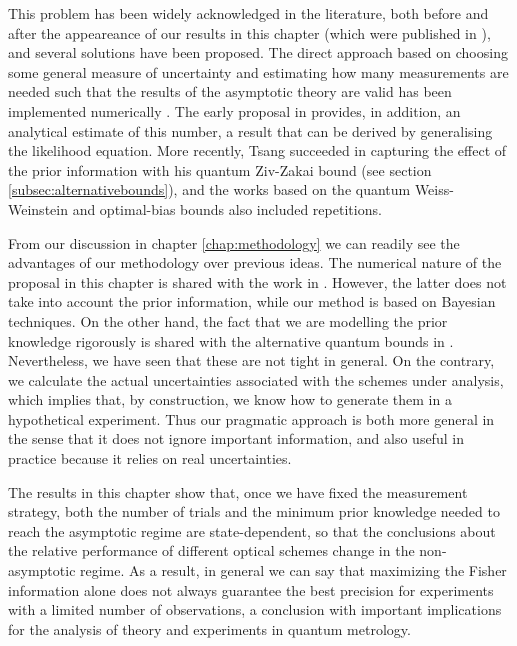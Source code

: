 This problem has been widely acknowledged in the literature, both before \cite{braunstein_gaussian1992, hall2012, tsang2012, tsang2016, rafal2015, liu2016} and after \cite{smirne2018, lumino2017, braun2018, haase2018may} the appeareance of our results in this chapter (which were published in \cite{jesus2017}), and several solutions have been proposed. The direct approach based on choosing some general measure of uncertainty and estimating how many measurements are needed such that the results of the asymptotic theory are valid has been implemented numerically \cite{braunstein_maxlikelihood1992, braunstein_gaussian1992}. The early proposal in \cite{braunstein_gaussian1992} provides, in addition, an analytical estimate of this number, a result that can be derived by generalising the likelihood equation. More recently, Tsang \cite{tsang2012} succeeded in capturing the effect of the prior information with his quantum Ziv-Zakai bound (see section \ref{subsec:alternativebounds}), and the works based on the quantum Weiss-Weinstein \cite{tsang2016} and optimal-bias bounds \cite{liu2016} also included repetitions.  

From our discussion in chapter \ref{chap:methodology} we can readily see the advantages of our methodology over previous ideas. The numerical nature of the proposal in this chapter is shared with the work in \cite{braunstein_maxlikelihood1992}. However, the latter does not take into account the prior information, while our method is based on Bayesian techniques. On the other hand, the fact that we are modelling the prior knowledge rigorously is shared with the alternative quantum bounds in \cite{tsang2012, tsang2016, liu2016}. Nevertheless, we have seen that these are not tight in general. On the contrary, we calculate the actual uncertainties associated with the schemes under analysis, which implies that, by construction, we know how to generate them in a hypothetical experiment. Thus our pragmatic approach is both more general in the sense that it does not ignore important information, and also useful in practice because it relies on real uncertainties. 

The results in this chapter show that, once we have fixed the measurement strategy, both the number of trials and the minimum prior knowledge needed to reach the asymptotic regime are state-dependent, so that the conclusions about the relative performance of different optical schemes change in the non-asymptotic regime. As a result, in general we can say that maximizing the Fisher information alone does not always guarantee the best precision for experiments with a limited number of observations, a conclusion with important implications for the analysis of theory and experiments in quantum metrology.


